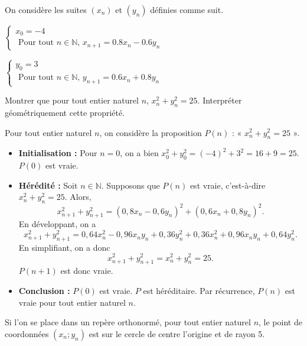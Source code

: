 \documentclass[11pt,fleqn]{book} %
\begin{document}
\begin{exercise}[topic=rec01]On considère les suites $(x_n)$ et $(y_n)$ définies comme suit.

\begin{minipage}{0.45\linewidth}
$\left\{ \begin{array}{ll}
x_0 = -4 \\
\text{ Pour tout }n \in \mathbb{N}, \, x_{n+1}=0.8x_n-0.6y_n
\end{array}\right.$
\end{minipage}\hfill\begin{minipage}{0.45\linewidth}
$\left\{ \begin{array}{ll}
y_0 = 3 \\
\text{ Pour tout }n\in\mathbb{N}, \, y_{n+1}=0.6x_n+0.8y_n
\end{array}\right.$
\end{minipage}

Montrer que pour tout entier naturel $n$, $x_n^2 + y_n^2= 25$. Interpréter géométriquement cette propriété.\end{exercise}
\begin{solution}Pour tout entier naturel $n$, on considère la proposition $P(n)$ : « $x_n^2+y_n^2=25 $ ».
\begin{itemize}
\item \textbf{Initialisation :} Pour $n=0$, on a bien $x_0^2+y_0^2=(-4)^2+3^2=16+9=25$. $P(0)$ est vraie.
\item \textbf{Hérédité :} Soit $n\in\mathbb{N}$. Supposons que $P(n)$ est vraie, c'est-à-dire $x_n^2+y_n^2=25$. Alors,
\[x_{n+1}^2+y_{n+1}^2=(0,8x_n-0,6y_n)^2+(0,6x_n+0,8y_n)^2.\]
En développant, on a
\[x_{n+1}^2+y_{n+1}^2=0,64x_n^2-0,96x_ny_n+0,36y_n^2+0,36x_n^2+0,96x_ny_n+0,64y_n^2.\]
En simplifiant, on a donc
\[x_{n+1}^2+y_{n+1}^2=x_n^2+y_n^2=25.\]
 $P(n+1)$ est donc vraie.
\item \textbf{Conclusion :} $P(0)$ est vraie. $P$ est héréditaire. Par récurrence, $P(n)$ est vraie pour tout entier naturel $n$.
\end{itemize}
Si l'on se place dans un repère orthonormé, pour tout entier naturel \(n\), le point de coordonnées $(x_n;y_n)$ est sur le cercle de centre l'origine et de rayon 5. \end{solution}
\end{document}
